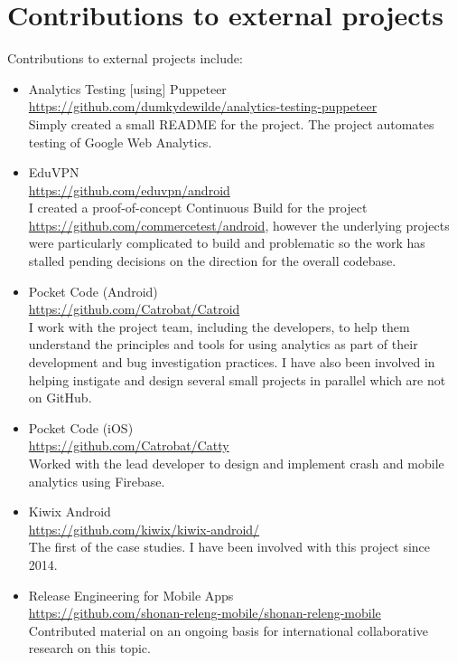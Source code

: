 \section{Contributions to external projects}
Contributions to external projects include:
\begin{itemize}
    \item Analytics Testing [using] Puppeteer\\ \url{https://github.com/dumkydewilde/analytics-testing-puppeteer}\\ Simply created a small README for the project. The project automates testing of Google Web Analytics.
    
    \item EduVPN\\
    \url{https://github.com/eduvpn/android}\\
    I created a proof-of-concept Continuous Build for the project \url{https://github.com/commercetest/android}, however the underlying projects were particularly complicated to build and problematic so the work has stalled pending decisions on the direction for the overall codebase.
    
    \item Pocket Code (Android)\\
    \url{https://github.com/Catrobat/Catroid}\\
    I work with the project team, including the developers, to help them understand the principles and tools for using analytics as part of their development and bug investigation practices. I have also been involved in helping instigate and design several small projects in parallel which are not on GitHub.
    
    \item Pocket Code (iOS)\\
    \url{https://github.com/Catrobat/Catty}\\
    Worked with the lead developer to design and implement crash and mobile analytics using Firebase.
    
    \item Kiwix Android\\
    \url{https://github.com/kiwix/kiwix-android/}\\
    The first of the case studies. I have been involved with this project since 2014.

    \item Release Engineering for Mobile Apps\\ \url{https://github.com/shonan-releng-mobile/shonan-releng-mobile}\\ Contributed material on an ongoing basis for international collaborative research on this topic. 
\end{itemize}

